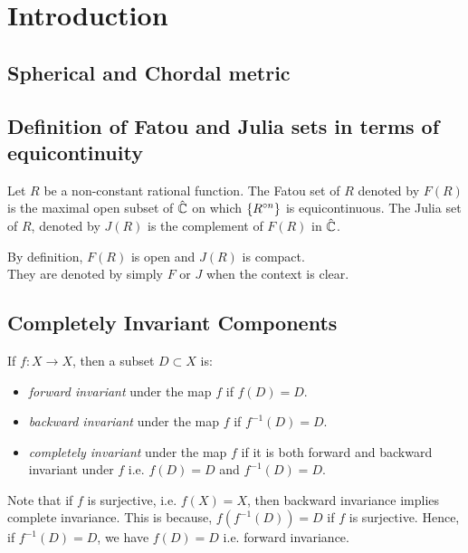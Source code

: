 \chapter{Introduction}
\section{Spherical and Chordal metric}

\section{Definition of Fatou and Julia sets in terms of equicontinuity}
\begin{definition}
	Let \( R \) be a non-constant rational function. The Fatou set of \( R \) denoted by \( F(R) \) is 
	the maximal open subset of \( \hat{\mathbb{C}} \) on which \( \{\ror[n]\}\) is equicontinuous. The Julia set of \( R \),
	denoted by \( J(R) \) is the complement of \( F(R) \) in \( \hat{\mathbb{C}} \).
\end{definition}
By definition, \( F(R) \) is open and \( J(R) \) is compact.\\
They are denoted by simply \( F \) or \( J \) when the context is clear.

\section{Completely Invariant Components}
If \( f:X\to X \), then a subset \( D\subset X \) is:
\begin{itemize}
	\item \emph{forward invariant} under the map \( f \) if \( f(D)=D \).
	\item \emph{backward invariant} under the map \( f \) if \( f^{-1}(D)=D \).
	\item \emph{completely invariant} under the map \( f \) if it is both forward
		and backward invariant under \( f \) i.e. \( f(D)=D \) and \( f^{-1}(D)=D \).
\end{itemize}
Note that if \( f \) is surjective, i.e. \( f(X)=X \), then backward invariance implies complete invariance.
This is because, \( f(f^{-1}(D))=D \) if \( f \) is surjective. Hence, if \(f^{-1}(D)=D  \), we have \( f(D)=D \) i.e.
forward invariance.

